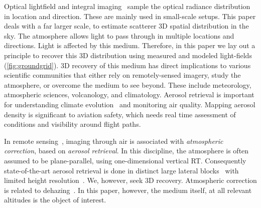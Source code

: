 \documentclass[10pt,letterpaper]{article}
\begin{document}
Optical lightfield and integral imaging~\cite{Stern2006,kim,Ng1948}
sample the optical radiance distribution in location and
direction. These are mainly used in small-scale setups. This paper
deals with a far larger scale, to estimate scatterer 3D spatial
distribution in the sky.  The atmosphere allows light to pass through
in multiple locations and directions. Light is affected by this
medium. Therefore, in this paper we lay out a principle to recover
this 3D distribution using measured and modeled light-fields
(\cref{fig:groundgrid}).  3D recovery of this medium has direct
implications to various scientific communities that either rely on
remotely-sensed imagery, study the atmosphere, or overcome the medium
to see beyond. These include meteorology, atmospheric sciences,
volcanology, and climatology.  Aerosol retrieval is important for
understanding climate evolution~\cite{Dayan2008,kalashnikova} and
monitoring air quality. Mapping aerosol density is significant to
aviation safety, which needs real time assessment of conditions and
visibility around flight paths.

In remote sensing~\cite{Mishchenko2007}, imaging through air
is associated with {\em atmospheric correction}, based on {\em aerosol
  retrieval}. In this discipline, the atmosphere is often assumed to
be plane-parallel, using one-dimensional vertical RT. Consequently
state-of-the-art aerosol retrieval is done in distinct large lateral
blocks~\cite{Martonchikc} with limited height
resolution~\cite{kalashnikova}. We, however, seek 3D
recovery. Atmospheric correction is related to
dehazing~\cite{Namer2009}. In this paper, however, the medium itself,
at all relevant altitudes is the object of interest.
\end{document}
